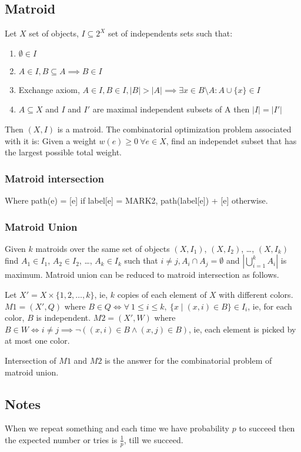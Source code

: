 \documentclass[a4paper,10pt,oneside]{article}
\newcommand\includess[2]{
   \subsubsection{#1}
   
}
\begin{document}
\begin{multicols}{2}
\subsection{Matroid}
Let $X$ set of objects, $I \subseteq 2^X$ set of independents sets such that:
\begin{enumerate}
\item $\emptyset \in I$
\item $A \in I, B \subseteq A \implies B \in I$
\item Exchange axiom, $A \in I, B \in I, |B| > |A| \implies \exists x \in B \setminus A : A \cup \{x\} \in I$
\item $A \subseteq X$ and $I$ and $I'$ are maximal independent subsets of A then $|I| = |I'|$
\end{enumerate}
Then $(X, I)$ is a matroid. The combinatorial optimization problem associated with it is: Given a weight $w(e) \geq 0 ~\forall e \in X$, find an independet subset that has the largest possible total weight.

\includess{Matroid intersection}{code/matroid.cpp}

Where path(e) = [e] if label[e] = MARK2, path(label[e]) + [e] otherwise.

\subsubsection{Matroid Union}
Given $k$ matroids over the same set of objects $(X, I_1)$, $(X, I_2)$, \dots, $(X, I_k)$ find $A_1 \in I_1$, $A_2 \in I_2$, \dots, $A_k \in I_k$ such that $i \not= j, A_i \cap A_j = \emptyset$ and $|\bigcup\limits_{i=1}^{k} A_i|$ is maximum. Matroid union can be reduced to matroid intersection as follows.

Let $X' = X \times \{1, 2, \dots, k\}$, ie, $k$ copies of each element of $X$ with different colors. $M1 = (X', Q)$ where $B \in Q \iff \forall ~1 \le i \le k, ~\{x\mid (x, i) \in B\} \in I_i$, ie, for each color, $B$ is independent. $M2 = (X', W)$ where $B \in W \iff i \not= j \implies \lnot((x, i) \in B \land (x, j) \in B)$, ie, each element is picked by at most one color.

Intersection of $M1$ and $M2$ is the answer for the combinatorial problem of matroid union.

\subsection{Notes}
When we repeat something and each time we have probability $p$ to succeed then the expected number or tries is $\frac{1}{p}$, till we succeed.


\end{multicols}
\end{document}
